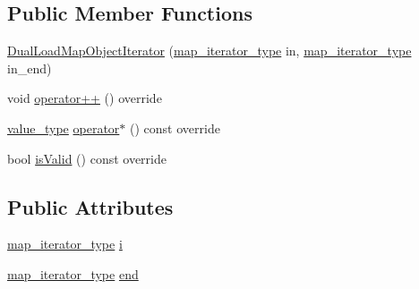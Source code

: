 \subsection*{Public Member Functions}
\begin{DoxyCompactItemize}
\item 
\hyperlink{structvt_1_1vrt_1_1collection_1_1balance_1_1_dual_load_map_object_iterator_a21f014ad87cc4f8214d58c87fc15bd7b}{Dual\+Load\+Map\+Object\+Iterator} (\hyperlink{structvt_1_1vrt_1_1collection_1_1balance_1_1_dual_load_map_object_iterator_a86bac54b4dc71af6b0a7cf5aa7ced433}{map\+\_\+iterator\+\_\+type} in, \hyperlink{structvt_1_1vrt_1_1collection_1_1balance_1_1_dual_load_map_object_iterator_a86bac54b4dc71af6b0a7cf5aa7ced433}{map\+\_\+iterator\+\_\+type} in\+\_\+end)
\item 
void \hyperlink{structvt_1_1vrt_1_1collection_1_1balance_1_1_dual_load_map_object_iterator_a7cb1ececd261483b92541a35df607ca6}{operator++} () override
\item 
\hyperlink{structvt_1_1vrt_1_1collection_1_1balance_1_1_object_iterator_impl_a8a38ab2c722e341d729f61cb59112376}{value\+\_\+type} \hyperlink{structvt_1_1vrt_1_1collection_1_1balance_1_1_dual_load_map_object_iterator_a196f4c50ef27bde15a3ed905be60889b}{operator$\ast$} () const override
\item 
bool \hyperlink{structvt_1_1vrt_1_1collection_1_1balance_1_1_dual_load_map_object_iterator_ab4a90db790a06e69ab1056e3043e27ae}{is\+Valid} () const override
\end{DoxyCompactItemize}
\subsection*{Public Attributes}
\begin{DoxyCompactItemize}
\item 
\hyperlink{structvt_1_1vrt_1_1collection_1_1balance_1_1_dual_load_map_object_iterator_a86bac54b4dc71af6b0a7cf5aa7ced433}{map\+\_\+iterator\+\_\+type} \hyperlink{structvt_1_1vrt_1_1collection_1_1balance_1_1_dual_load_map_object_iterator_a0edbc786a1f046560ba137163ed1187b}{i}
\item 
\hyperlink{structvt_1_1vrt_1_1collection_1_1balance_1_1_dual_load_map_object_iterator_a86bac54b4dc71af6b0a7cf5aa7ced433}{map\+\_\+iterator\+\_\+type} \hyperlink{structvt_1_1vrt_1_1collection_1_1balance_1_1_dual_load_map_object_iterator_aae2da6edc9d40ba415f4452aedc2782f}{end}
\end{DoxyCompactItemize}


